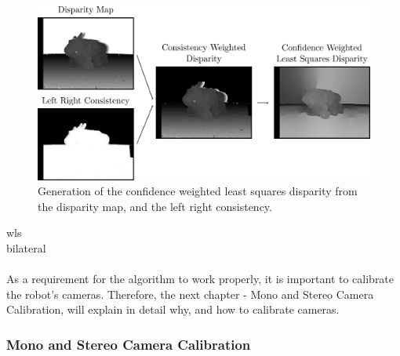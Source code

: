\begin{figure}[h]
	\centering
	\includegraphics[scale=.28]{chapters/03_background/img/weighted_least_squares_disparity.png}
	\caption{Generation of the confidence weighted least squares disparity from the disparity map, and the left right consistency.}
	\label{fig::323_weighted_least_squares_disparity}
\end{figure}

\cite{min2014fast}   wls\\
\cite{tomasi1998bilateral} bilateral
\\\\
As a requirement for the algorithm to work properly, it is important to calibrate the robot's cameras. Therefore, the next chapter - Mono and Stereo Camera Calibration, will explain in detail why, and how to calibrate cameras.
\subsubsection{Mono and Stereo Camera Calibration}